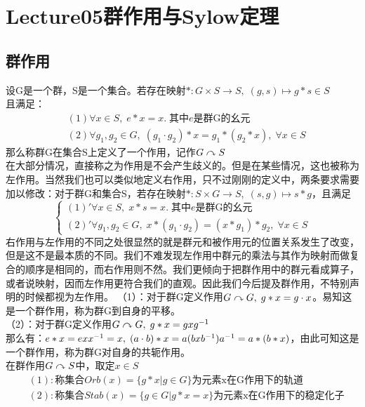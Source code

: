 \chapter*{Lecture05群作用与Sylow定理}

\section{群作用}

设G是一个群，S是一个集合。若存在映射$*\colon G\times S\to S,\; (g,s)\mapsto g*s\in S$\\
且满足：
\[
\begin{aligned}
&(1)\forall x\in S,\; e*x=x.\; \text{其中}e\text{是群G的幺元}\\
&(2)\forall g_1,g_2\in G,\; (g_1\cdot g_2)*x=g_1*(g_2*x),\; \forall x\in S
\end{aligned}
\]
那么称群G在集合S上定义了一个作用，记作$G\curvearrowright S$\\
在大部分情况，直接称之为作用是不会产生歧义的。但是在某些情况，这也被称为左作用。当然我们也可以类似地定义右作用，只不过刚刚的定义中，两条要求需要加以修改：对于群G和集合S，若存在映射$*\colon S\times G\to S,\; (s,g)\mapsto s*g$，且满足
\[
\left\{
\begin{aligned}
(1)'\forall x\in S,\; x*s=x.\; \text{其中}e\text{是群G的幺元}\\
(2)'\forall g_1,g_2\in G,\; x*(g_1\cdot g_2)=(x*g_1)*g_2,\; \forall x\in S
\end{aligned}\right.
\]
右作用与左作用的不同之处很显然的就是群元和被作用元的位置关系发生了改变，但是这不是最本质的不同。我们不难发现左作用中群元的乘法与其作为映射而做复合的顺序是相同的，而右作用则不然。我们更倾向于把群作用中的群元看成算子，或者说映射，因而左作用更符合我们的直观。因此我们今后提及群作用，不特别声明的时候都视为左作用。
（1）：对于群G定义作用$G\curvearrowright G,\; g*x=g\cdot x$。易知这是一个群作用，称为群G到自身的平移。\\
（2）：对于群G定义作用$G\curvearrowright G,\; g*x=gx{g}^{-1}$\\
那么有：$e*x=ex{x}^{-1}=x,\; (a\cdot b)*x=a(bx{b}^{-1}){a}^{-1}=a*(b*x)$，由此可知这是一个群作用，称为群G对自身的共轭作用。\\
在群作用$G\curvearrowright S$中，取定$x\in S$\\
\begin{align*}
&(1):\text{称集合}Orb(x)=\{g*x|g\in G\}\text{为元素x在G作用下的轨道}\\
&(2):\text{称集合}Stab(x)=\{g\in G|g*x=x\}\text{为元素x在G作用下的稳定化子}
\end{align*}
